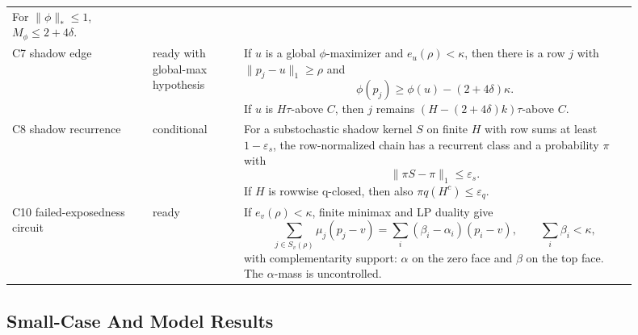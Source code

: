 \documentclass[11pt]{article}
\newcommand{\status}[1]{\textsf{#1}}
\newcommand{\ready}{\status{ready}}
\newcommand{\conditional}{\status{conditional}}
\theoremstyle{definition}
\begin{document}
\begin{longtable}{p{0.20\linewidth}p{0.13\linewidth}p{0.57\linewidth}}
For \(\|\phi\|_*\leq1\), \(M_\phi\leq 2+4\delta\).\\
\addlinespace
C7 shadow edge &
\ready{} with global-max hypothesis &
If \(u\) is a global \(\phi\)-maximizer and \(e_u(\rho)<\kappa\), then there
is a row \(j\) with \(\|p_j-u\|_1\geq\rho\) and
\[
  \phi(p_j)\geq \phi(u)-(2+4\delta)\kappa.
\]
If \(u\) is \(H\tau\)-above \(C\), then \(j\) remains
\((H-(2+4\delta)k)\tau\)-above \(C\).\\
\addlinespace
C8 shadow recurrence &
\conditional{} &
For a substochastic shadow kernel \(S\) on finite \(H\) with row sums at
least \(1-\varepsilon_s\), the row-normalized chain has a recurrent class and
a probability \(\pi\) with
\[
  \|\pi S-\pi\|_1\leq\varepsilon_s.
\]
If \(H\) is rowwise q-closed, then also \(\pi q(H^c)\leq\varepsilon_q\).\\
\addlinespace
C10 failed-exposedness circuit &
\ready{} &
If \(e_v(\rho)<\kappa\), finite minimax and LP duality give
\[
  \sum_{j\in S_v(\rho)}\mu_j(p_j-v)
  =
  \sum_i(\beta_i-\alpha_i)(p_i-v),
  \qquad \sum_i\beta_i<\kappa,
\]
with complementarity support: \(\alpha\) on the zero face and \(\beta\) on
the top face.  The \(\alpha\)-mass is uncontrolled.\\
\bottomrule
\end{longtable}

\subsection{Small-Case And Model Results}
\end{document}
